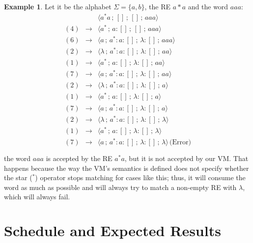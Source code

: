 \documentclass[oneside,12pt]{scrbook}
\theoremstyle{definition}
\newtheorem{Example}{Example}
\theoremstyle{plain}
\theoremstyle{definition}
\begin{document}
\begin{Example}
	Let it be the alphabet $\Sigma = \{a,b\}$, the RE $a*a$ and the word $aaa$:
	\[
		\begin{array}{rcl}
		& & \langle a^*a \,;\, [] \,;\, [] \,;\, aaa \rangle \\
			(4) & \rightarrow & \langle a^* \,;\, a:[] \,;\, [] \,;\, aaa \rangle \\
			(6) & \rightarrow & \langle a \,;\, a^*:a:[] \,;\, \lambda:[] \,;\, aaa \rangle \\
			(2) & \rightarrow & \langle \lambda \,;\, a^*:a:[] \,;\, \lambda:[] \,;\, aa \rangle \\
			(1) & \rightarrow & \langle a^* \,;\, a:[] \,;\, \lambda:[] \,;\, aa \rangle \\
			(7) & \rightarrow & \langle a \,;\, a^*:a:[] \,;\, \lambda:[] \,;\, aa \rangle \\
			(2) & \rightarrow & \langle \lambda \,;\, a^*:a:[] \,;\, \lambda:[] \,;\, a \rangle \\
			(1) & \rightarrow & \langle a^* \,;\, a:[] \,;\, \lambda:[] \,;\, a \rangle \\
			(7) & \rightarrow & \langle a \,;\, a^*:a:[] \,;\, \lambda:[] \,;\, a \rangle \\
			(2) & \rightarrow & \langle \lambda \,;\, a^*:a:[] \,;\, \lambda:[] \,;\, \lambda \rangle \\
			(1) & \rightarrow & \langle a^* \,;\, a:[] \,;\, \lambda:[] \,;\, \lambda \rangle \\
			(7) & \rightarrow & \langle a \,;\, a^*:a:[] \,;\, \lambda:[] \,;\, \lambda \rangle \, \text{(Error)} \\\\
		\end{array}
	\]
	the word $aaa$ is accepted by the RE $a^*a$, but it is not accepted by our VM. That happens because the way the VM's semantics is defined does not specify whether the star ($^*$) operator stops matching for cases like this; thus, it will consume the word as much as possible and will always try to match a non-empty RE with $\lambda$, which will always fail.
\end{Example}



\chapter{Schedule and Expected Results}\label{chapter:schedule}
\end{document}
